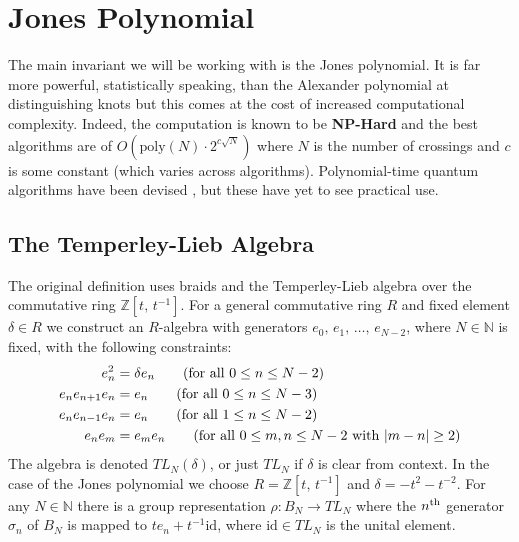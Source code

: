 \section{Jones Polynomial}
    The main invariant we will be working with is the Jones polynomial. It is
    far more powerful, statistically speaking, than the Alexander polynomial
    at distinguishing knots but this comes at the cost of increased
    computational complexity. Indeed, the computation is known to be
    \textbf{NP-Hard} \cite[p.~2]{Przytycka1991SubexponentiallyCT}
    and the best algorithms are of
    $O(\textrm{poly}(N)\cdot{2}^{c\sqrt{N}})$ where
    $N$ is the number of crossings and $c$ is some constant (which varies
    across algorithms). Polynomial-time quantum algorithms have been devised
    \cite{JonesQuantumAlgorithm},
    but these have yet to see practical use.
    \subsection{The Temperley-Lieb Algebra}
        The original definition uses braids and the Temperley-Lieb algebra
        over the commutative ring $\mathbb{Z}[t,\,t^{-1}]$. For a general
        commutative ring $R$ and fixed element $\delta\in{R}$ we construct
        an $R$-algebra with generators $e_{0},\,e_{1},\,\dots,\,e_{N-2}$,
        where $N\in\mathbb{N}$ is fixed, with the following constraints:
        \begin{align}
            e_{n}^{2}&=\delta{e}_{n}
            \tag{for all $0\leq{n}\leq{N-2}$}\\
            e_{n}e_{n+1}e_{n}&=e_{n}
            \tag{for all $0\leq{n}\leq{N-3}$}\\
            e_{n}e_{n-1}e_{n}&=e_{n}
            \tag{for all $1\leq{n}\leq{N-2}$}\\
            e_{n}e_{m}&=e_{m}e_{n}
            \tag{for all $0\leq{m,n}\leq{N-2}$ with $|m-n|\geq{2}$}
        \end{align}
        The algebra is denoted $TL_{N}(\delta)$, or just $TL_{N}$ if $\delta$
        is clear from context. In the case of the Jones polynomial we choose
        $R=\mathbb{Z}[t,\,t^{-1}]$ and $\delta=-t^{2}-t^{-2}$. For any
        $N\in\mathbb{N}$ there is a group representation
        $\rho:B_{N}\rightarrow{TL}_{N}$ where the $n^{\small\textrm{th}}$
        generator $\sigma_{n}$ of $B_{N}$ is mapped to
        $te_{n}+t^{-1}\textrm{id}$, where $\textrm{id}\in{TL}_{N}$ is the
        unital element.
        \par\hfill\par

